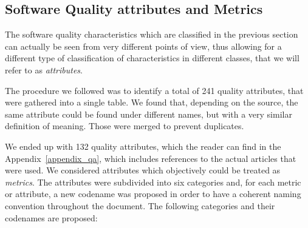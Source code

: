 \subsection{Software Quality attributes and Metrics}
\label{subsec:SW_quality_attributes}

The software quality characteristics which are classified in the previous section can actually be seen from very different points of view, thus allowing for a different type of classification of characteristics in different classes, that we will refer to as \textit{attributes}.

The procedure we followed was to identify a total of 241 quality attributes, that were gathered into a single table. We found that, depending on the source, the same attribute could be found under different names, but with a very similar definition of meaning. Those were merged to prevent duplicates.

We ended up with 132 quality attributes, which the reader can find in the Appendix~\ref{appendix_qa}, which includes references to the actual articles that were used. We considered attributes which objectively could be treated as \textit{metrics}. The attributes were subdivided into six categories and, for each metric or attribute, a new codename was proposed in order to have a coherent naming convention throughout the document. The following categories and their codenames are proposed:

